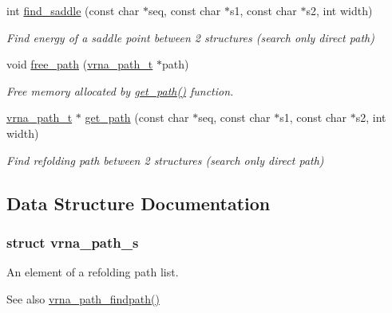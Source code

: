 \begin{DoxyCompactItemize}
int \hyperlink{group__direct__paths_ga4c0dabf032c04eeab9c7370d15db6ad2}{find\+\_\+saddle} (const char $\ast$seq, const char $\ast$s1, const char $\ast$s2, int width)
\begin{DoxyCompactList}\small\item\em Find energy of a saddle point between 2 structures (search only direct path) \end{DoxyCompactList}\item 
void \hyperlink{group__direct__paths_ga9056421d716ae89f0ed3f107627f395b}{free\+\_\+path} (\hyperlink{group__direct__paths_ga818d4f3d1cf8723d6905990b08d909fe}{vrna\+\_\+path\+\_\+t} $\ast$path)
\begin{DoxyCompactList}\small\item\em Free memory allocated by \hyperlink{group__direct__paths_gac009a44db824f90a6de5f9c28b9b3222}{get\+\_\+path()} function. \end{DoxyCompactList}\item 
\hyperlink{group__direct__paths_ga818d4f3d1cf8723d6905990b08d909fe}{vrna\+\_\+path\+\_\+t} $\ast$ \hyperlink{group__direct__paths_gac009a44db824f90a6de5f9c28b9b3222}{get\+\_\+path} (const char $\ast$seq, const char $\ast$s1, const char $\ast$s2, int width)
\begin{DoxyCompactList}\small\item\em Find refolding path between 2 structures (search only direct path) \end{DoxyCompactList}\end{DoxyCompactItemize}


\subsection{Data Structure Documentation}
\label{structvrna__path__s}
\subsubsection{struct vrna\+\_\+path\+\_\+s}
An element of a refolding path list. 

\begin{DoxySeeAlso}{See also}
\hyperlink{group__direct__paths_ga4b2283c4142cafd99678495585fcc842}{vrna\+\_\+path\+\_\+findpath()} 
\end{DoxySeeAlso}
